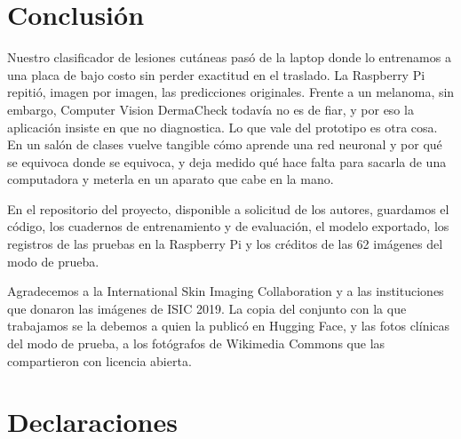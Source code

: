 \documentclass[pdflatex,sn-mathphys-num]{sn-jnl}%
\theoremstyle{thmstyleone}%
\theoremstyle{thmstyletwo}%
\theoremstyle{thmstylethree}%
\begin{document}
\section{Conclusión}\label{sec13}

Nuestro clasificador de lesiones cutáneas pasó de la laptop donde lo entrenamos a una placa de bajo costo sin perder exactitud en el traslado. La Raspberry Pi repitió, imagen por imagen, las predicciones originales. Frente a un melanoma, sin embargo, Computer Vision DermaCheck todavía no es de fiar, y por eso la aplicación insiste en que no diagnostica. Lo que vale del prototipo es otra cosa. En un salón de clases vuelve tangible cómo aprende una red neuronal y por qué se equivoca donde se equivoca, y deja medido qué hace falta para sacarla de una computadora y meterla en un aparato que cabe en la mano.

\backmatter


En el repositorio del proyecto, disponible a solicitud de los autores, guardamos el código, los cuadernos de entrenamiento y de evaluación, el modelo exportado, los registros de las pruebas en la Raspberry Pi y los créditos de las 62 imágenes del modo de prueba.


Agradecemos a la International Skin Imaging Collaboration y a las instituciones que donaron las imágenes de ISIC 2019. La copia del conjunto con la que trabajamos se la debemos a quien la publicó en Hugging Face, y las fotos clínicas del modo de prueba, a los fotógrafos de Wikimedia Commons que las compartieron con licencia abierta.

\section*{Declaraciones}
\end{document}
